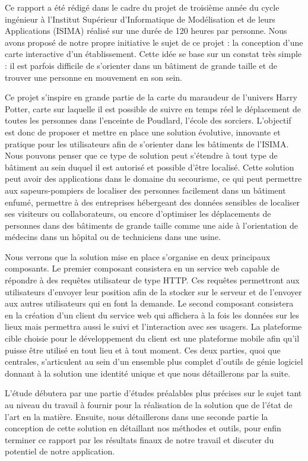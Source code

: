 
Ce rapport a été rédigé dans le cadre du projet de troisième année du cycle ingénieur à l’Institut Supérieur d’Informatique de Modélisation et de leurs Applications (ISIMA) réalisé sur une durée de 120 heures par personne. Nous avons proposé de notre propre initiative le sujet de ce projet : la conception d’une carte interactive d’un établissement. Cette idée se base sur un constat très simple : il est parfois difficile de s'orienter dans un bâtiment de grande taille et de trouver une personne en mouvement en son sein.

Ce projet s’inspire en grande partie de la carte du maraudeur de l’univers Harry Potter, carte sur laquelle il est possible de suivre en temps réel le déplacement de toutes les personnes dans l’enceinte de Poudlard, l’école des sorciers. L'objectif est donc de proposer et mettre en place une solution évolutive, innovante et pratique pour les utilisateurs afin de s'orienter dans les bâtiments de l'ISIMA. Nous pouvons penser que ce type de solution peut s'étendre à tout type de bâtiment au sein duquel il est autorisé et possible d'être localisé. Cette solution peut avoir des applications dans le domaine du secourisme, ce qui peut permettre aux sapeurs-pompiers de localiser des personnes facilement dans un bâtiment enfumé, permettre à des entreprises hébergeant des données sensibles de localiser ses visiteurs ou collaborateurs, ou encore d’optimiser les déplacements de personnes dans des bâtiments de grande taille comme une aide à l’orientation de médecins dans un hôpital ou de techniciens dans une usine.

Nous verrons que la solution mise en place s'organise en deux principaux composants. Le premier composant consistera en un service web capable de répondre à des requêtes utilisateur de type HTTP. Ces requêtes permettront aux utilisateurs d'envoyer leur position afin de la stocker sur le serveur et de l'envoyer aux autres utilisateurs qui en font la demande. Le second composant consistera en la création d'un client du service web qui affichera à la fois les données sur les lieux mais permettra aussi le suivi et l’interaction avec ses usagers. La plateforme cible choisie pour le développement du client est une plateforme mobile afin qu’il puisse être utilisé en tout lieu et à tout moment. Ces deux parties, quoi que centrales, s’articulent au sein d’un ensemble plus complet d’outils de génie logiciel donnant à la solution une identité unique et que nous détaillerons par la suite.

L'étude débutera par une partie d’études préalables plus précises sur le sujet tant au niveau du travail à fournir pour la réalisation de la solution que de l’état de l’art en la matière. Ensuite, nous détaillerons dans une seconde partie la conception de cette solution en détaillant nos méthodes et outils, pour enfin terminer ce rapport par les résultats finaux de notre travail et discuter du potentiel de notre application.
